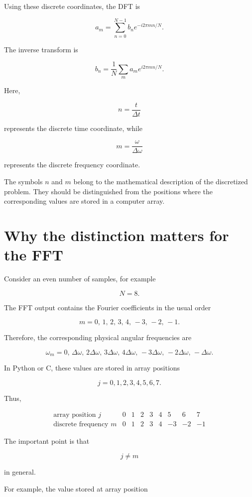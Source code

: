 \documentclass[11pt]{article}
\begin{document}
Using these discrete coordinates, the DFT is

\[
a_m
=
\sum_{n=0}^{N-1}
b_n
e^{-i2\pi mn/N}.
\]

The inverse transform is

\[
b_n
=
\frac{1}{N}
\sum_m
a_m
e^{i2\pi mn/N}.
\]

Here,

\[
n=\frac{t}{\Delta t}
\]

represents the discrete time coordinate, while

\[
m=\frac{\omega}{\Delta\omega}
\]

represents the discrete frequency coordinate.

The symbols $n$ and $m$ belong to the mathematical description of the
discretized problem. They should be distinguished from the positions where
the corresponding values are stored in a computer array.

\section*{Why the distinction matters for the FFT}

Consider an even number of samples, for example

\[
N=8.
\]

The FFT output contains the Fourier coefficients in the usual order

\[
m=
0,\,
1,\,
2,\,
3,\,
4,\,
-3,\,
-2,\,
-1.
\]

Therefore, the corresponding physical angular frequencies are

\[
\omega_m=
0,\,
\Delta\omega,\,
2\Delta\omega,\,
3\Delta\omega,\,
4\Delta\omega,\,
-3\Delta\omega,\,
-2\Delta\omega,\,
-\Delta\omega.
\]

In Python or C, these values are stored in array positions

\[
j=0,1,2,3,4,5,6,7.
\]

Thus,

\[
\begin{array}{c|rrrrrrrr}
\text{array position } j
&0&1&2&3&4&5&6&7
\\
\hline
\text{discrete frequency } m
&0&1&2&3&4&-3&-2&-1
\end{array}
\]

The important point is that

\[
j \neq m
\]

in general.

For example, the value stored at array position
\end{document}
